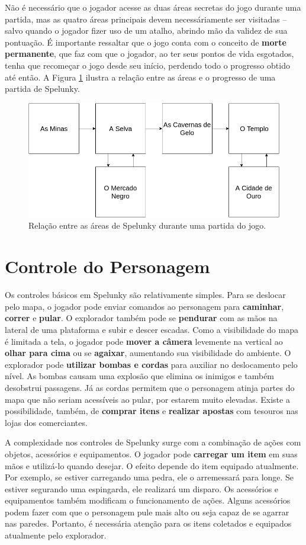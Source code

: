 Não é necessário que o jogador acesse as duas áreas secretas do jogo durante uma
partida, mas as quatro áreas principais devem necessáriamente ser visitadas --
salvo quando o jogador fizer uso de um atalho, abrindo mão da validez de sua
pontuação. É importante ressaltar que o jogo conta com o conceito de
\textbf{morte permanente}, que faz com que o jogador, ao ter seus pontos de vida
esgotados, tenha que recomeçar o jogo desde seu início, perdendo todo o
progresso obtido até então.  A Figura \ref{fig:spelunky-run} ilustra a relação
entre as áreas e o progresso de uma partida de Spelunky.

\begin{figure}[htb!]
\centering
\includegraphics[width=.65\textwidth]{fig/spelunky-run.png}
\caption{\label{fig:spelunky-run}Relação entre as áreas de Spelunky durante uma
partida do jogo.}
\end{figure}


\section{\label{section:spelunky-controls}Controle do Personagem}
Os controles básicos em Spelunky são relativamente simples. Para se deslocar
pelo mapa, o jogador pode enviar comandos ao personagem para \textbf{caminhar},
\textbf{correr} e \textbf{pular}. O explorador também pode se \textbf{pendurar}
com as mãos na lateral de uma plataforma e subir e descer escadas. Como a
visibilidade do mapa é limitada a tela, o jogador pode \textbf{mover a câmera}
levemente na vertical ao \textbf{olhar para cima} ou se \textbf{agaixar},
aumentando sua visibilidade do ambiente. O explorador pode \textbf{utilizar
bombas e cordas} para auxiliar no deslocamento pelo nível. As bombas causam uma
explosão que elimina os inimigos e também desobstrui passagens. Já as cordas
permitem que o personagem atinja partes do mapa que não seriam acessíveis ao
pular, por estarem muito elevadas. Existe a possibilidade, também, de
\textbf{comprar itens} e \textbf{realizar apostas} com tesouros nas lojas dos
comerciantes.

A complexidade nos controles de Spelunky surge com a combinação de ações com
objetos, acessórios e equipamentos. O jogador pode \textbf{carregar um
item} em suas mãos e utilizá-lo quando desejar. O efeito depende do item
equipado atualmente. Por exemplo, se estiver carregando uma pedra, ele o
arremessará para longe. Se estiver segurando uma espingarda, ele realizará um
disparo. Os acessórios e equipamentos também modificam o funcionamento de ações.
Alguns acessórios podem fazer com que o personagem pule mais alto ou seja capaz
de se agarrar nas paredes. Portanto, é necessária atenção para os itens
coletados e equipados atualmente pelo explorador.


